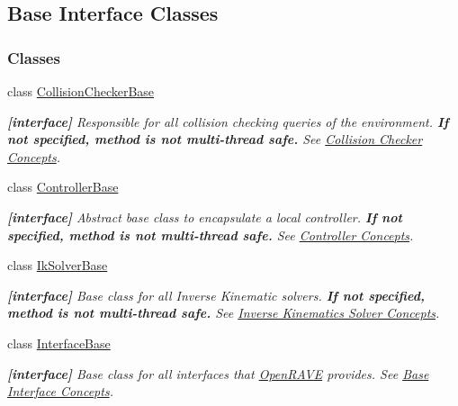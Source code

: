 \hypertarget{group__interfaces}{
\subsection{Base Interface Classes}
\label{group__interfaces}
}
\subsubsection*{Classes}
\begin{DoxyCompactItemize}
\item 
class \hyperlink{classOpenRAVE_1_1CollisionCheckerBase}{CollisionCheckerBase}
\begin{DoxyCompactList}\small\item\em {\bfseries \mbox{[}interface\mbox{]}} Responsible for all collision checking queries of the environment. {\bfseries If not specified, method is not multi-\/thread safe.} See \hyperlink{arch__collisionchecker}{Collision Checker Concepts}. \item\end{DoxyCompactList}\item 
class \hyperlink{classOpenRAVE_1_1ControllerBase}{ControllerBase}
\begin{DoxyCompactList}\small\item\em {\bfseries \mbox{[}interface\mbox{]}} Abstract base class to encapsulate a local controller. {\bfseries If not specified, method is not multi-\/thread safe.} See \hyperlink{arch__controller}{Controller Concepts}. \item\end{DoxyCompactList}\item 
class \hyperlink{classOpenRAVE_1_1IkSolverBase}{IkSolverBase}
\begin{DoxyCompactList}\small\item\em {\bfseries \mbox{[}interface\mbox{]}} Base class for all Inverse Kinematic solvers. {\bfseries If not specified, method is not multi-\/thread safe.} See \hyperlink{arch__iksolver}{Inverse Kinematics Solver Concepts}. \item\end{DoxyCompactList}\item 
class \hyperlink{classOpenRAVE_1_1InterfaceBase}{InterfaceBase}
\begin{DoxyCompactList}\small\item\em {\bfseries \mbox{[}interface\mbox{]}} Base class for all interfaces that \hyperlink{namespaceOpenRAVE}{OpenRAVE} provides. See \hyperlink{interface__concepts}{Base Interface Concepts}. \item\end{DoxyCompactList}\item 

\end{DoxyCompactItemize}
